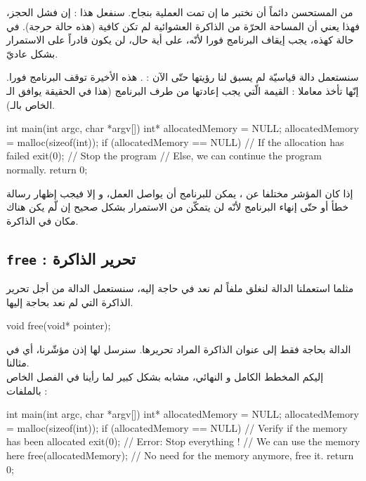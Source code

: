 من المستحسن دائماً أن نختبر ما إن تمت العملية بنجاح. سنفعل هذا : إن فشل الحجز، فهذا يعني أن المساحة الحرّة من الذاكرة العشوائية لم تكن كافية (هذه حالة حرجة). في حالة كهذه، يجب إيقاف البرنامج فورا لأنّه، على أية حال، لن يكون قادراً على الاستمرار بشكل عاديّ.

سنستعمل دالة قياسيّة لم يسبق لنا رؤيتها حتّى الآن :
.
هذه الأخيرة توقف البرنامج فورا. إنّها تأخذ معاملا : القيمة الّتي يجب إعادتها من طرف البرنامج (هذا في الحقيقة يوافق الـ
الخاص بالـ).

\begin{Csource}
int main(int argc, char *argv[])
{
	int* allocatedMemory = NULL;
	allocatedMemory = malloc(sizeof(int));
	if (allocatedMemory == NULL) // If the allocation has failed
	{
    	exit(0); // Stop the program
	}
	// Else, we can continue the program normally.
	return 0;
}
\end{Csource}

إذا كان المؤشر مختلفا عن
،
يمكن للبرنامج أن يواصل العمل، و إلا فيجب إظهار رسالة خطأ أو حتّى إنهاء البرنامج لأنّه لن يتمكّن من الاستمرار بشكل صحيح إن لّم يكن هناك مكان في الذاكرة.

\subsection{\texttt{free} : تحرير الذاكرة}

مثلما استعملنا الدالة
لنغلق ملفاً لم نعد في حاجة إليه، سنستعمل الدالة
من أجل تحرير الذاكرة التي لم نعد بحاجة إليها.

\begin{Csource}
void free(void* pointer);
\end{Csource}

الدالة
بحاجة فقط إلى عنوان الذاكرة المراد تحريرها. سنرسل لها إذن مؤشّرنا، أي
في مثالنا.\\
إليكم المخطط الكامل و النهائي، مشابه بشكل كبير لما رأينا في الفصل الخاص بالملفات :

\begin{Csource}
int main(int argc, char *argv[])
{
	int* allocatedMemory = NULL;
	allocatedMemory = malloc(sizeof(int));
	if (allocatedMemory == NULL) // Verify if the memory has been allocated
	{
		exit(0); // Error: Stop everything !
	}
	// We can use the memory here
	free(allocatedMemory); // No need for the memory anymore, free it.
	return 0;
}
\end{Csource}

